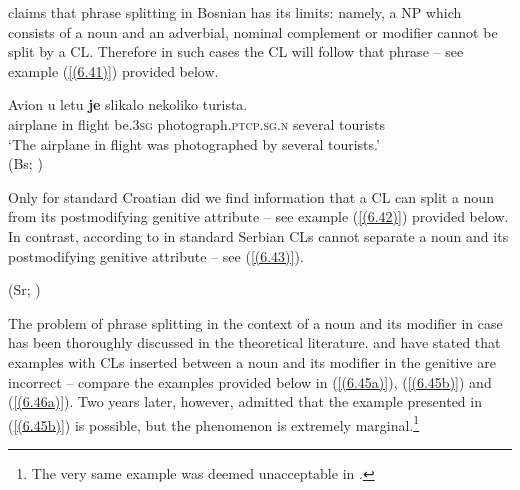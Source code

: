\citet[560]{Ridjanovic12} claims that phrase splitting in Bosnian has its limits: namely, a NP which consists of a noun and an adverbial, nominal complement or modifier cannot be split by a CL. Therefore in such cases the CL will follow that phrase  \citep[560]{Ridjanovic12} – see example (\ref{(6.41)}) provided below.

\begin{exe}\ex\label{(6.41)}
\gll Avion u letu \textbf{je} slikalo nekoliko turista.\\
 airplane in flight be\textsc{.3sg} photograph\textsc{.ptcp.sg.n} several tourists\\
\glt ‘The airplane in flight was photographed by several tourists.’ \\
\hfill  (Bs; \citealt[560]{Ridjanovic12})
\end{exe}

\noindent Only for standard Croatian did we find information that a CL can split a noun from its postmodifying genitive attribute – see example (\ref{(6.42)}) provided below. In contrast, according to \citet[306f]{Pesikan58} in standard Serbian CLs cannot separate a noun and its postmodifying genitive attribute – see (\ref{(6.43)}).

\begin{exe}

\strut\hfill  (Sr; \citealt[306f]{Pesikan58})
\end{exe}

\noindent The problem of phrase splitting in the context of a noun and its modifier in case has been thoroughly discussed in the theoretical literature. \citet[70]{FranksProgovac94} and \citet[522]{MiseskaTomic96} have stated that examples with CLs inserted between a noun and its modifier in the genitive are incorrect – compare the examples provided below in (\ref{(6.45a)}), (\ref{(6.45b)}) and (\ref{(6.46a)}). Two years later, however, \citet[419]{Progovac96} admitted that the example presented in (\ref{(6.45b)}) is possible, but the phenomenon is extremely marginal.\footnote{The very same example was deemed unacceptable in \citet{FranksProgovac94}.}

